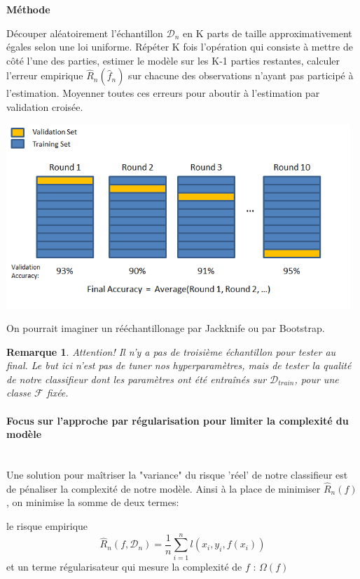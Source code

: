 \documentclass[a4paper]{article}
\theoremstyle{plain}
\newtheorem*{remark*}{Remarque}
\newcommand{\myparagraph}[1]{\paragraph{#1}\mbox{}\\}
\begin{document}
\textbf{Méthode}\\
\begin{outline}
\1 Découper aléatoirement l'échantillon $\mathcal{D}_n$ en K parts de taille approximativement égales selon une loi uniforme.
\1 Répéter K fois l'opération qui consiste à mettre de côté l'une des parties, estimer le modèle sur les K-1 parties restantes, calculer l'erreur empirique $\hat R_n(\hat f_n)$ sur chacune des observations n'ayant pas participé à l'estimation.
\1 Moyenner toutes ces erreurs pour aboutir à l'estimation par validation croisée.
\end{outline}

\includegraphics[width=13cm]{CrossValidation.png}

On pourrait imaginer un rééchantillonage par Jackknife ou par Bootstrap.\\
\begin{remark*}
Attention! Il n'y a pas de troisième échantillon pour tester au final. Le but ici n'est pas de tuner nos hyperparamètres, mais de tester la qualité de notre classifieur dont les paramètres ont été entraînés sur $\mathcal{D}_{train}$, pour une classe $\mathcal{F}$ fixée.

\end{remark*}


\myparagraph{Focus sur l'approche par régularisation pour limiter la complexité du modèle}

Une solution pour maîtriser la "variance" du risque 'réel' de notre classifieur est de pénaliser la complexité de notre modèle. Ainsi à la place de minimiser $\hat R_n(f)$, on minimise la somme de deux termes:
\begin{outline}
\1 le risque empirique $$\hat R_n(f, \mathcal{D}_n) = \frac{1}{n}\sum_{i=1}^{n}\mathit{l}(x_i,y_i,f(x_i))$$
\1 et un terme régularisateur qui mesure la complexité de $f$ : $\Omega(f)$
\end{outline}
\end{document}
